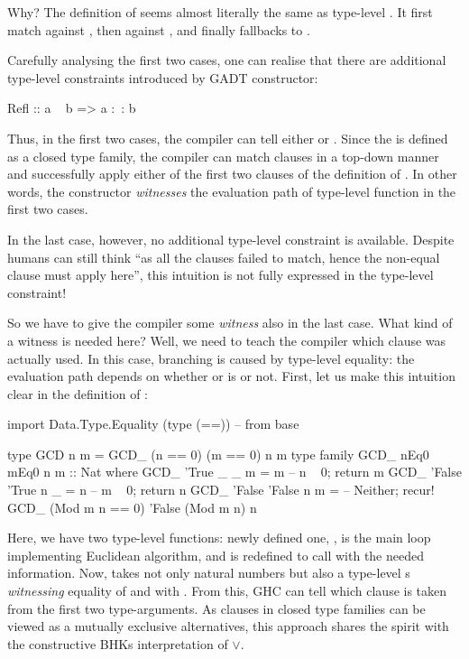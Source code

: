 \documentclass[demotion-paper.tex]{subfiles}
\begin{document}
Why? The definition of  seems almost literally the same as type-level .
It first match  against , then  against , and finally fallbacks to .

Carefully analysing the first two cases, one can realise that there are additional type-level constraints introduced by  GADT constructor:

\begin{code}
  Refl :: a ~ b => a :~: b
\end{code}

Thus, in the first two cases, the compiler can tell either  or .
Since the  is defined as a closed type family, the compiler can match clauses in a top-down manner and successfully apply either of the first two clauses of the definition of .
In other words, the constructor  \emph{witnesses} the evaluation path of type-level function  in the first two cases.

In the last case, however, no additional type-level constraint is available.
Despite humans can still think ``as all the  clauses failed to match, hence the non-equal clause must apply here'', this intuition is not fully expressed in the type-level constraint!

So we have to give the compiler some \emph{witness} also in the last case.
What kind of a witness is needed here?
Well, we need to teach the compiler which clause was actually used.
In this case, branching is caused by type-level equality: the evaluation path depends on whether  or  is  or not.
First, let us make this intuition clear in the definition of :

\begin{code}
import Data.Type.Equality (type (==)) -- from base

type GCD n m = GCD_ (n == 0) (m == 0) n m
type family GCD_ nEq0 mEq0 n m :: Nat where
  GCD_ 'True  _      _ m = m  -- n ~ 0; return m
  GCD_ 'False 'True  n _ = n  -- m ~ 0; return n
  GCD_ 'False 'False n m =    -- Neither; recur!
    GCD_ (Mod m n == 0) 'False (Mod m n) n
\end{code}

Here, we have two type-level functions: newly defined one, , is the main loop implementing Euclidean algorithm, and
 is redefined to call  with the needed information.
Now,  takes not only natural numbers but also a type-level s \emph{witnessing} equality of  and  with .
From this, GHC can tell which clause is taken from the first two type-arguments.
As clauses in closed type families can be viewed as a mutually exclusive alternatives, this approach shares the spirit with the constructive BHKs interpretation of $\vee$.
\end{document}
